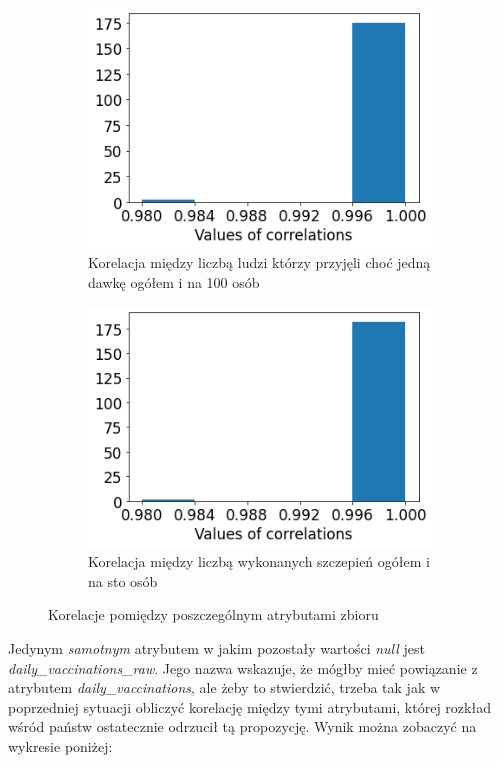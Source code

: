 \documentclass[12pt, oneside, openany]{article}
\begin{document}
\begin{figure}
  \begin{subfigure}[t]{.4\textwidth}
    \centering
    \includegraphics[width=\linewidth]{../img/null_column_diff3.png}
    \caption{Korelacja między liczbą ludzi którzy przyjęli choć jedną dawkę ogółem i na 100 osób}
  \end{subfigure}
  \hfill
  \begin{subfigure}[t]{.4\textwidth}
    \centering
    \includegraphics[width=\linewidth]{../img/null_column_diff4.png}
    \caption{Korelacja między liczbą wykonanych szczepień ogółem i na sto osób}
  \end{subfigure}
  \caption{Korelacje pomiędzy poszczególnym atrybutami zbioru}
\label{Rys:kor}
\end{figure}


Jedynym \textit{samotnym} atrybutem w jakim pozostały wartości \textit{null} jest \textit{daily\_vaccinations\_raw}. Jego nazwa wskazuje, że mógłby mieć powiązanie z atrybutem \textit{daily\_vaccinations}, ale żeby to stwierdzić, trzeba tak jak w poprzedniej sytuacji obliczyć korelację między tymi atrybutami, której rozkład wśród państw ostatecznie odrzucił tą propozycję. Wynik można zobaczyć na wykresie poniżej:
\end{document}
